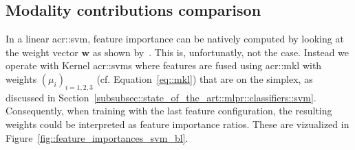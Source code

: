     \subsection{Modality contributions comparison}
        \label{subsec::more_experiments::classifier::feature_importance}
        In a linear \gls{acr::svm}, feature importance can be natively computed by looking at the weight vector \(\bm{w}\) as shown by~\textcite{guyon2002gene}.
        This is, unfortunatly, not the case.
        Instead we operate with Kernel \glspl{acr::svm} where features are fused using \gls{acr::mkl} with weights \(\left(\mu_i\right)_{i=1, 2, 3}\) (cf. Equation~\ref{eq::mkl}) that are on the simplex, as discussed in Section~\ref{subsubsec::state_of_the_art::mlpr::classifiers::svm}.
        Consequently, when training with the last feature configuration, the resulting weights could be interpreted as feature importance ratios.
        These are vizualized in Figure~\ref{fig::feature_importances_svm_bl}.\\

        \begin{figure}[htpb]
            \centering
        \end{figure}

